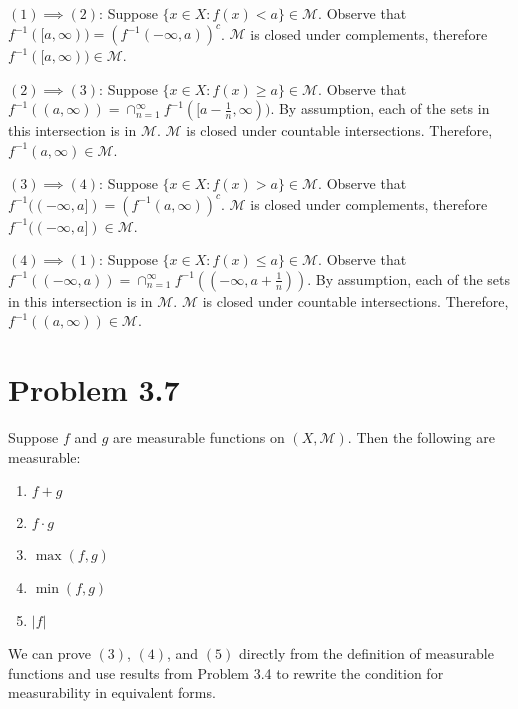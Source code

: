 \documentclass[letterpaper,12pt]{article}
\theoremstyle{definition}
\begin{document}
      $(1) \implies (2)$: Suppose $\{x \in X : f(x) < a \} \in \mathcal{M}$. Observe that $f^{-1}([a, \infty)) = (f^{-1}(-\infty, a))^c$. $\mathcal{M}$   is closed under complements, therefore $f^{-1}([a, \infty)) \in \mathcal{M}$.
\newline

      $(2) \implies (3)$: Suppose $\{x \in X : f(x) \geq a \} \in \mathcal{M}$. Observe that $f^{-1}((a, \infty)) = \cap_{n=1}^{\infty} f^{-1}([a - \frac{1}{n}, \infty))$.      By assumption, each of the sets in this intersection is in $\mathcal{M}$. $\mathcal{M}$ is closed under countable intersections. Therefore, $f^{-1}(a, \infty) \in \mathcal{M}$.
\newline

      $(3) \implies (4)$:  Suppose $\{x \in X : f(x) > a \} \in \mathcal{M}$. Observe that $f^{-1}((-\infty, a]) = (f^{-1}(a, \infty))^c$. $\mathcal{M}$  is closed under complements, therefore $f^{-1}((-\infty, a]) \in \mathcal{M}$.
\newline

      $(4) \implies (1)$: Suppose $\{x \in X : f(x) \leq a \} \in \mathcal{M}$. Observe that $f^{-1}((-\infty, a)) = \cap_{n=1}^{\infty} f^{-1}((-\infty, a + \frac{1}{n}))$.
 By assumption, each of the sets in this intersection is in $\mathcal{M}$. $\mathcal{M}$ is closed under countable intersections. Therefore, $f^{-1}((a, \infty)) \in \mathcal{M}$.



    \section*{Problem 3.7}
    Suppose $f$ and $g$ are measurable functions on $(X,\mathcal{M})$. Then the following are measurable:
    \begin{enumerate}
    	\item $f + g$
    	\item $f \cdot g$
    	\item $\max(f,g)$
    	\item $\min(f,g)$
    	\item $|f|$
    \end{enumerate}

    We can prove $(3)$, $(4)$, and $(5)$ directly from the definition of measurable functions and use results from Problem 3.4 to rewrite the condition for measurability in equivalent forms.
\end{document}
